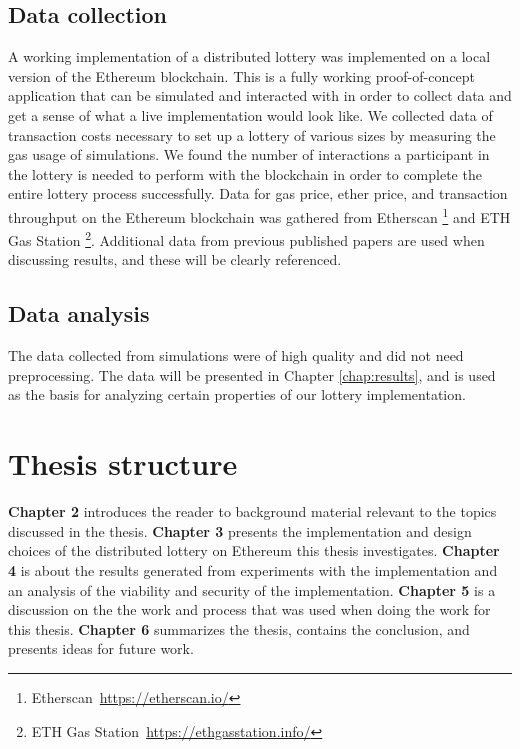 \subsection{Data collection}

A working implementation of a distributed lottery was implemented on a local version of the Ethereum blockchain. This is a fully working proof-of-concept application that can be simulated and interacted with in order to collect data and get a sense of what a live implementation would look like. 
We collected data of transaction costs necessary to set up a lottery of various sizes by measuring the gas usage of simulations. 
We found the number of interactions a participant in the lottery is needed to perform with the blockchain in order to complete the entire lottery process successfully. 
Data for gas price, ether price, and transaction throughput on the Ethereum blockchain was gathered from Etherscan \footnote{Etherscan~\url{https://etherscan.io/}} and ETH Gas Station \footnote{ETH Gas Station~\url{https://ethgasstation.info/}}. 
Additional data from previous published papers are used when discussing results, and these will be clearly referenced.

\subsection{Data analysis}

The data collected from simulations were of high quality and did not need preprocessing. The data will be presented in Chapter \ref{chap:results}, and is used as the basis for analyzing certain properties of our lottery implementation. 

\section{Thesis structure}

\textbf{Chapter 2} introduces the reader to background material relevant to the topics discussed in the thesis. \newline
\textbf{Chapter 3} presents the implementation and design choices of the distributed lottery on Ethereum this thesis investigates.
\newline
\textbf{Chapter 4} is about the results generated from experiments with the implementation and an analysis of the viability and security of the implementation.
\newline
\textbf{Chapter 5} is a discussion on the the work and process that was used when doing the work for this thesis.
\newline
\textbf{Chapter 6} summarizes the thesis, contains the conclusion, and presents ideas for future work. 
